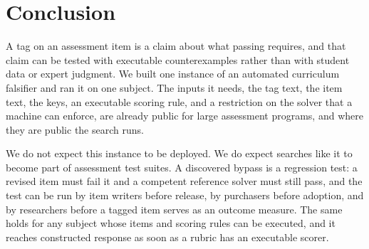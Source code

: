\section{Conclusion}
\label{sec:conclusion}

A tag on an assessment item is a claim about what passing requires, and that claim can be tested with executable counterexamples rather than with student data or expert judgment. We built one instance of an automated curriculum falsifier and ran it on one subject. The inputs it needs, the tag text, the item text, the keys, an executable scoring rule, and a restriction on the solver that a machine can enforce, are already public for large assessment programs, and where they are public the search runs.

We do not expect this instance to be deployed. We do expect searches like it to become part of assessment test suites. A discovered bypass is a regression test: a revised item must fail it and a competent reference solver must still pass, and the test can be run by item writers before release, by purchasers before adoption, and by researchers before a tagged item serves as an outcome measure. The same holds for any subject whose items and scoring rules can be executed, and it reaches constructed response as soon as a rubric has an executable scorer.
